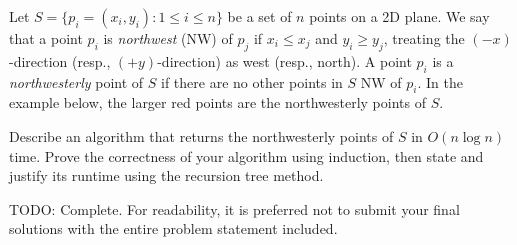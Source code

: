\documentclass[11pt]{article}
\begin{document}
\pagebreak
\begin{question}

Let $S = \{p_i=(x_i, y_i): 1 \le i \le n\}$ be a set of $n$ points on a 2D plane. We say that a point $p_i$ is \emph{northwest} (NW) of $p_j$ if $x_i \leq x_j$ and $y_i \geq y_j$, treating the $(-x)$-direction (resp., $(+y)$-direction) as west (resp., north).
A point $p_i$ is a \emph{northwesterly} point of $S$ if there are no other points in $S$ NW of $p_i$.
In the example below, the larger red points are the northwesterly points of $S$.\\

\begin{figure}[htp]
\centering
{}
\end{figure}

Describe an algorithm that returns the northwesterly points of $S$ in $O(n \log n)$ time. Prove the correctness of your algorithm using induction, then state and justify its runtime using the recursion tree method. 

\begin{solution}
TODO: Complete. For readability, it is preferred not to submit your final solutions with the entire problem statement included.
\end{solution}


\end{question}

\end{document}
